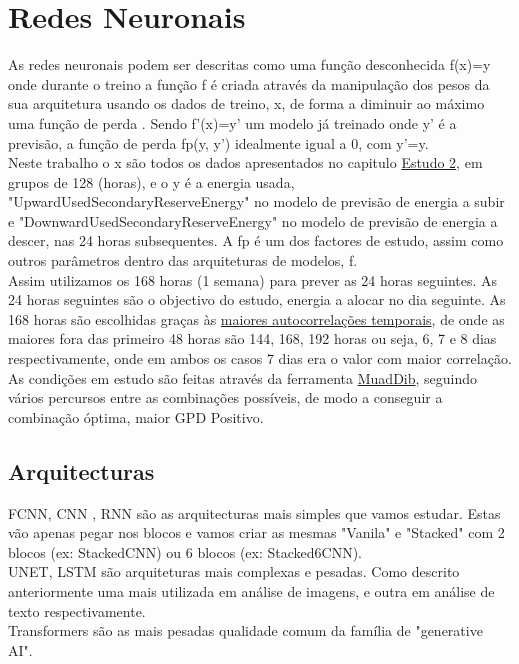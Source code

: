 \section{Redes Neuronais}

As redes neuronais podem ser descritas como uma função desconhecida f(x)=y onde durante o treino a função f é criada através da manipulação dos pesos da sua arquitetura usando os dados de treino, x, de forma a diminuir ao máximo uma função de perda . Sendo f'(x)=y' um modelo já treinado onde y' é a previsão, a função de perda fp(y, y') idealmente igual a 0, com y'=y.\\
Neste trabalho o x são todos os dados apresentados no capitulo \hyperref[ch:estudo_2]{Estudo 2}, em grupos de 128 (horas), e o y é a energia usada, "UpwardUsedSecondaryReserveEnergy" no modelo de previsão de energia a subir e "DownwardUsedSecondaryReserveEnergy" no modelo de previsão de energia a descer, nas 24 horas subsequentes. A fp é um dos factores de estudo, assim como outros parâmetros dentro das arquiteturas de modelos, f.\\
Assim utilizamos os 168 horas (1 semana) para prever as 24 horas seguintes. As 24 horas seguintes são o objectivo do estudo, energia a alocar no dia seguinte. As 168 horas são escolhidas graças às \hyperref[tab:tempcorr]{maiores autocorrelações temporais}, de onde as maiores fora das primeiro 48 horas são 144, 168, 192 horas ou seja, 6, 7 e 8 dias respectivamente, onde em ambos os casos 7 dias era o valor com maior correlação.\\
As condições em estudo são feitas através da ferramenta \hyperref[se:muaddib]{MuadDib}, seguindo vários percursos entre as combinações possíveis, de modo a conseguir a combinação óptima, maior GPD Positivo.\\


\subsection{Arquitecturas}

FCNN, CNN , RNN são as arquitecturas mais simples que vamos estudar. Estas vão apenas pegar nos blocos e vamos criar as mesmas "Vanila" e "Stacked" com 2 blocos (ex: StackedCNN) ou 6 blocos (ex: Stacked6CNN).\\
UNET, LSTM são arquiteturas mais complexas e pesadas. Como descrito anteriormente uma mais utilizada em análise de imagens, e outra em análise de texto respectivamente.\\
Transformers são as mais pesadas qualidade comum da família de "generative AI".

